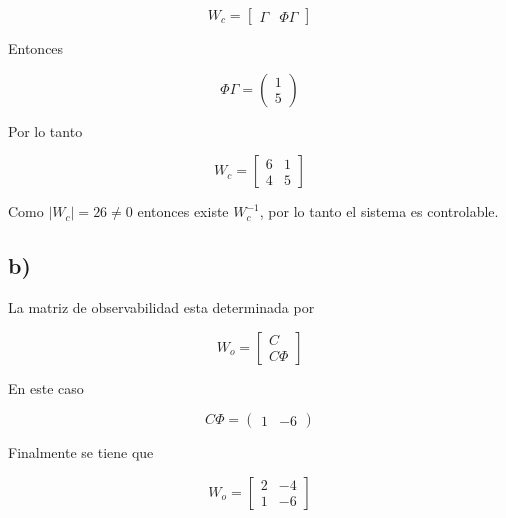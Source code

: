 \documentclass[11pt,a4paper]{article}
\begin{document}
    \begin{equation}
        W_c = 
        \begin{bmatrix}
            \Gamma & \Phi \Gamma
        \end{bmatrix}
    \end{equation}

    Entonces 

    \begin{equation}
        \Phi \Gamma = 
        \begin{pmatrix}
            1 \\ 5
        \end{pmatrix}
    \end{equation}

    Por lo tanto 

    \begin{equation}
        W_c = 
        \begin{bmatrix}
            6 & 1 \\ 
            4 & 5
        \end{bmatrix}
    \end{equation}

    Como $|W_c| = 26 \neq 0$ entonces existe $W_c^{-1}$, por lo tanto el sistema es controlable.

    \subsection*{b)}

    La matriz de observabilidad esta determinada por 

    \begin{equation}
        W_o = 
        \begin{bmatrix}
            C \\ C\Phi
        \end{bmatrix}
    \end{equation}

    En este caso 

    \begin{equation}
        C \Phi = 
        \begin{pmatrix}
            1 & -6
        \end{pmatrix}
    \end{equation}

    Finalmente se tiene que 

    \begin{equation}
        W_o = 
        \begin{bmatrix}
            2 & -4 \\
            1 & -6
        \end{bmatrix}
    \end{equation}
\end{document}
